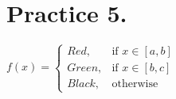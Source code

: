 \documentclass[a4paper,12pt]{article}
\begin{document}
\section*{Practice 5.}
$f(x)=\begin{cases}
                                 Red, &\text{if } x\in [a,b]\\
                                Green, &\text{if } x\in [b,c]\\
                               Black,&\text{otherwise }
                               \end{cases}$
%
%
%
%
%
%
%
%
\end{document}
